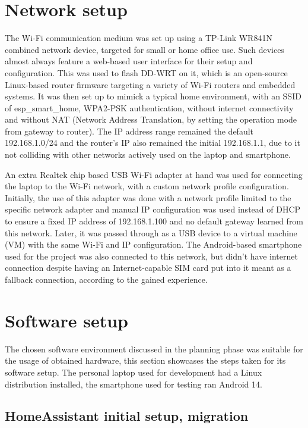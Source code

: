 \section{Network setup}

The Wi-Fi communication medium was set up using a TP-Link WR841N combined network device, targeted for small or home office use. Such devices almost always feature a web-based user interface for their setup and configuration. This was used to flash DD-WRT on it, which is an open-source Linux-based router firmware targeting a variety of Wi-Fi routers and embedded systems. \cite{DDWRTHomepage} It was then set up to mimick a typical home environment, with an SSID of esp\_smart\_home, WPA2-PSK authentication, without internet connectivity and without NAT (Network Address Translation, by setting the operation mode from gateway to router). The IP address range remained the default 192.168.1.0/24 and the router's IP also remained the initial 192.168.1.1, due to it not colliding with other networks actively used on the laptop and smartphone.

An extra Realtek chip based USB Wi-Fi adapter at hand was used for connecting the laptop to the Wi-Fi network, with a custom network profile configuration. Initially, the use of this adapter was done with a network profile limited to the specific network adapter and manual IP configuration was used instead of DHCP to ensure a fixed IP address of 192.168.1.100 and no default gateway learned from this network. Later, it was passed through as a USB device to a virtual machine (VM) with the same Wi-Fi and IP configuration. The Android-based smartphone used for the project was also connected to this network, but didn't have internet connection despite having an Internet-capable SIM card put into it meant as a fallback connection, according to the gained experience.

\section{Software setup}

The chosen software environment discussed in the planning phase was suitable for the usage of obtained hardware, this section showcases the steps taken for its software setup. The personal laptop used for development had a Linux distribution installed, the smartphone used for testing ran Android 14.

\subsection{HomeAssistant initial setup, migration}


